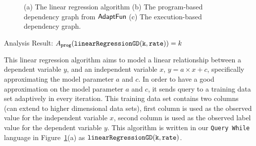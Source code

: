 \begin{example}
\begin{figure}
\begin{subfigure}{.8\textwidth}
\begin{centering}
         \caption{}
            \end{centering}
            \end{subfigure}
    \vspace{-0.5cm}
    \caption{(a) The linear regression algorithm 
    (b) The program-based dependency graph from $\textsf{AdaptFun}$
    (c) The execution-based dependency graph.}
    \vspace{-0.5cm}
    \label{fig:linear_regression}
\end{figure}
%
Analysis Result: $ A_{\mathtt{prog}}(\mathtt{linearRegressionGD(k, rate)}) = k$
\end{example} 
%
 
This linear regression algorithm 
aims to
model a linear relationship between a dependent variable $y$,
and an independent variable $x$, $y = a \times x + c$, specifically approximating the 
model parameter $a$ and $c$.
In order to have a good approximation on the model parameter 
$a$ and $c$, 
it sends query to a training data set adaptively in every iteration.
This training data set contains two columns (can extend to higher dimensional data sets), first column is used as the observed value for the independent variable $x$,
second column is used as the observed label value for the dependent variable $y$.
This algorithm is written in our {\tt Query While} language in Figure~\ref{fig:linear_regression}(a) as $\mathtt{linearRegressionGD(k, rate)}$.

